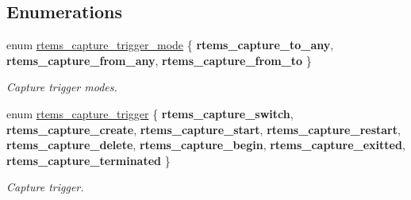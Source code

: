 \subsection*{Enumerations}
\begin{DoxyCompactItemize}
\item 
enum \mbox{\hyperlink{group__libmisc__capture_ga56557affa8f3021c9d5ed6ebca98f473}{rtems\+\_\+capture\+\_\+trigger\+\_\+mode}} \{ {\bfseries rtems\+\_\+capture\+\_\+to\+\_\+any}, 
{\bfseries rtems\+\_\+capture\+\_\+from\+\_\+any}, 
{\bfseries rtems\+\_\+capture\+\_\+from\+\_\+to}
 \}
\begin{DoxyCompactList}\small\item\em Capture trigger modes. \end{DoxyCompactList}\item 
enum \mbox{\hyperlink{group__libmisc__capture_ga5fd896f3981ec7db204355a0e527a074}{rtems\+\_\+capture\+\_\+trigger}} \{ \newline
{\bfseries rtems\+\_\+capture\+\_\+switch}, 
{\bfseries rtems\+\_\+capture\+\_\+create}, 
{\bfseries rtems\+\_\+capture\+\_\+start}, 
{\bfseries rtems\+\_\+capture\+\_\+restart}, 
\newline
{\bfseries rtems\+\_\+capture\+\_\+delete}, 
{\bfseries rtems\+\_\+capture\+\_\+begin}, 
{\bfseries rtems\+\_\+capture\+\_\+exitted}, 
{\bfseries rtems\+\_\+capture\+\_\+terminated}
 \}
\begin{DoxyCompactList}\small\item\em Capture trigger. \end{DoxyCompactList}\end{DoxyCompactItemize}
